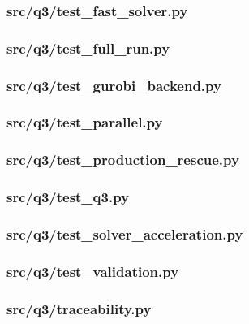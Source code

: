 \documentclass[zihao=-4,a4paper,UTF8,fontset=none]{ctexart}
\begin{document}
\subsubsection*{src/q3/test\_fast\_solver.py}


\subsubsection*{src/q3/test\_full\_run.py}


\subsubsection*{src/q3/test\_gurobi\_backend.py}


\subsubsection*{src/q3/test\_parallel.py}


\subsubsection*{src/q3/test\_production\_rescue.py}


\subsubsection*{src/q3/test\_q3.py}


\subsubsection*{src/q3/test\_solver\_acceleration.py}


\subsubsection*{src/q3/test\_validation.py}


\subsubsection*{src/q3/traceability.py}

\end{document}
